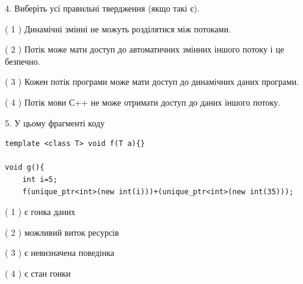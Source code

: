 \documentclass[12pt, ukrainian]{article}
\begin{document}
\begin {large}
{%
4. Виберіть усі правильні твердження (якщо такі є).\par
\vspace{2mm}

( 1 ) Динамічні змінні не можуть розділятися між потоками.%

( 2 ) Потік може мати доступ до автоматичних змінних іншого потоку і це безпечно.%

( 3 ) Кожен потік програми може мати доступ до динамічних даних програми.%

( 4 ) Потік мови С++ не може отримати доступ до даних іншого потоку.%


5. У цьому фрагменті коду
\begin{verbatim}
template <class T> void f(T a){}

void g(){
    int i=5;
    f(unique_ptr<int>(new int(i)))+(unique_ptr<int>(new int(35)));
\end{verbatim}
( 1 ) є гонка даних%

( 2 ) можливий виток ресурсів%

( 3 ) є невизначена поведінка%

( 4 ) є стан гонки%
}
\end {large}
\end{document}
